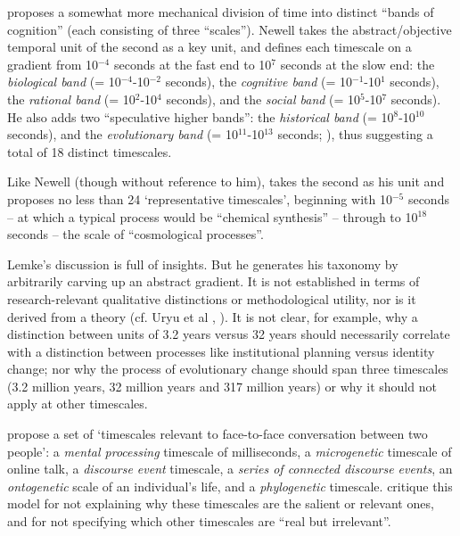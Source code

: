 \citet[122]{newell_unified_1990} proposes a somewhat more mechanical division of time 
into distinct ``bands of cognition'' (each consisting of three ``scales''). Newell takes the abstract/objective temporal unit of the second as a key 
unit, and defines each timescale on a gradient from 10$^{-4}$ 
seconds at the fast end to 10$^{7}$ seconds at the slow end: the 
\textit{biological band} (= 10$^{-4}$-10$^{-2}$ seconds), the 
\textit{cognitive band} (= 10$^{-1}$-10$^{1}$ seconds), the 
\textit{rational band} (= 10$^{2}$-10$^{4}$ seconds), and the 
\textit{social band} (= 10$^{5}$-10$^{7}$ seconds). He also 
adds two ``speculative higher bands'': the \textit{historical band} (= 
10$^{8}$-10$^{10}$ seconds), and the \textit{evolutionary band} 
(= 10$^{11}$-10$^{13}$ seconds; \citealt[152]{newell_unified_1990}), thus suggesting a 
total of 18 distinct timescales. 



Like Newell (though without reference to him), \citet[277]{lemke_across_2000} takes 
the second as his unit and proposes no less than 24 \textquoteleft representative 
timescales', beginning with 10$^{-5}$ seconds -- at which a typical 
process would be ``chemical synthesis'' -- through to 10$^{18}$ 
seconds -- the scale of ``cosmological processes''. 



Lemke's discussion is full of insights. But he generates his taxonomy by arbitrarily carving up an abstract gradient. It is not established in terms of research-relevant qualitative distinctions or 
methodological utility, nor is it derived from a theory (cf.  
Uryu et al \citeyear{uryu_ecology_2014}, \citeyear[169]{larsen-freeman_complexity_2008}). It is not clear, for example, why a distinction between units of 3.2 years 
versus 32 years should necessarily correlate with a distinction between 
processes like institutional planning versus identity change; nor why 
the process of evolutionary change should span three timescales (3.2 
million years, 32 million years and 317 million years) or why it should 
not apply at other timescales. 



\citet[169]{larsen-freeman_complexity_2008} propose a set of \textquoteleft timescales 
relevant to face-to-face conversation between two people': a \textit{mental processing }timescale of milliseconds, a \textit{microgenetic }
timescale of online talk, a \textit{discourse event} timescale, a 
\textit{series of connected discourse events}, an \textit{ontogenetic }scale of an individual's life, and a \textit{phylogenetic} timescale. \citet{uryu_ecology_2014} critique this model for not explaining why these 
timescales are the salient or relevant ones, and for not specifying 
which other timescales are ``real but irrelevant''. 



